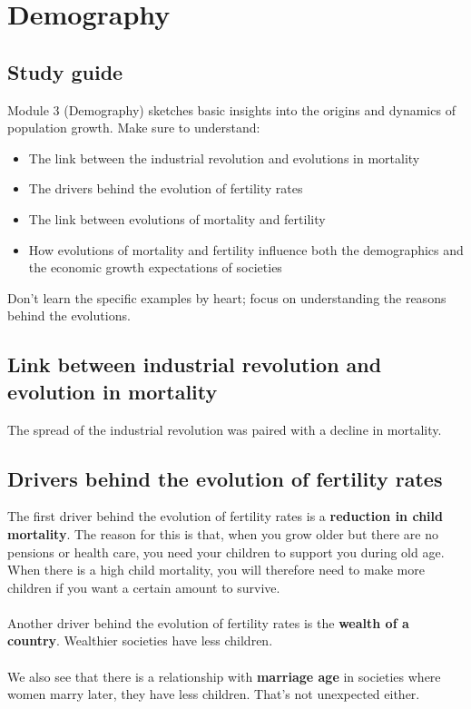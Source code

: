 \documentclass[../summary.tex]{subfiles}
\begin{document}
	
	\section{Demography}
	
	\subsection{Study guide}
	
	Module 3 (Demography) sketches basic insights into the origins and dynamics of population growth. Make sure to understand:
	\begin{itemize}
		\item The link between the industrial revolution and evolutions in mortality
		\item The drivers behind the evolution of fertility rates
		\item The link between evolutions of mortality and fertility
		\item How evolutions of mortality and fertility influence both the demographics and the economic
		growth expectations of societies
	\end{itemize}
	Don’t learn the specific examples by heart; focus on understanding the reasons behind the evolutions.
	
	\subsection{Link between industrial revolution and evolution in mortality}
	The spread of the industrial revolution was paired with a decline in mortality.  
	
	\subsection{Drivers behind the evolution of fertility rates}
	The first driver behind the evolution of fertility rates is a \textbf{reduction in child mortality}. The reason for this is that, when you grow older but there are no pensions or health care, you need your children to support you during old age. When there is a high child mortality, you will therefore need to make more children if you want a certain amount to survive.  
	\\
	\\
	Another driver behind the evolution of fertility rates is the \textbf{wealth of a country}. Wealthier societies have less children. 
	\\
	\\
	We also see that there is a relationship with \textbf{marriage age} in societies where women marry later, they have less children. That's not unexpected either. 
	
\end{document}
